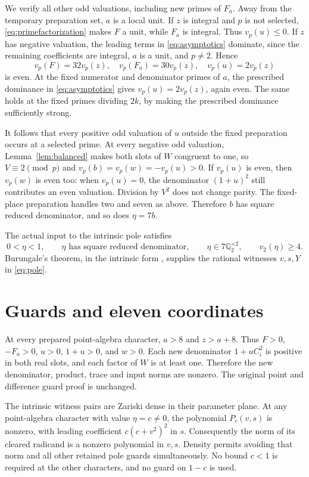 \documentclass[11pt,a4paper]{article}
\newcommand{\Q}{\mathbb Q}\newcommand{\Z}{\mathbb Z}
\begin{document}
We verify all other odd valuations, including new primes of $F_a$.
Away from the temporary preparation set, $a$ is a local unit.
If $z$ is integral and $p$ is not selected, \eqref{eq:primefactorization}
makes $F$ a unit, while $F_a$ is integral. Thus $v_p(u)\le0$.
If $z$ has negative valuation, the leading terms in
\eqref{eq:asymptotics} dominate, since the remaining coefficients are
integral, $a$ is a unit, and $p\ne2$. Hence
\[
 v_p(F)=32v_p(z),\quad v_p(F_a)=30v_p(z),\quad
                         v_p(u)=2v_p(z)
\]
is even. At the fixed numerator and denominator primes of $a$, the
prescribed dominance in \eqref{eq:asymptotics} gives
$v_p(u)=2v_p(z)$, again even. The same holds at the fixed primes
dividing $2k$, by making the prescribed dominance sufficiently strong.

It follows that every positive odd valuation of $u$ outside the fixed
preparation occurs at a selected prime. At every negative odd valuation,
Lemma~\ref{lem:balanced} makes both slots of $W$ congruent to one,
so $V\equiv2\pmod p$ and
$v_p(b)=v_p(w)=-v_p(u)>0$.
If $v_p(u)$ is even, then $v_p(w)$ is even too: when $v_p(u)=0$,
the denominator $(1+u)^2$ still contributes an even valuation.
Division by $V^2$ does not change parity. The fixed-place preparation
handles two and seven as above. Therefore $b$ has square reduced
denominator, and so does $\eta=7b$.

The actual input to the intrinsic pole satisfies
\[
 0<\eta<1,\qquad \eta\text{ has square reduced denominator},\qquad
 \eta\in7\Q_2^{\times2},\qquad v_2(\eta)\ge4.
\]
Burungale's theorem, in the intrinsic form \cite{Intrinsic}, supplies
the rational witnesses $v,s,Y$ in \eqref{eq:pole}.

\section{Guards and eleven coordinates}

At every prepared point-algebra character, $a>8$ and $z>a+8$.
Thus $F>0$, $-F_a>0$, $u>0$, $1+u>0$, and $w>0$.
Each new denominator $1+uC_i^2$ is positive in both real slots,
and each factor of $W$ is at least one. Therefore the new denominator,
product, trace and input norms are nonzero. The original point and
difference guard proof is unchanged.

The intrinsic witness pairs are Zariski dense in their parameter plane.
At any point-algebra character with value $\eta=c\ne0$, the
polynomial $P_c(v,s)$ is nonzero, with leading coefficient
$c(c+v^2)^2$ in $s$. Consequently the norm of its cleared radicand
is a nonzero polynomial in $v,s$. Density permits avoiding that norm
and all other retained pole guards simultaneously. No bound $c<1$
is required at the other characters, and no guard on $1-c$ is used.
\end{document}
